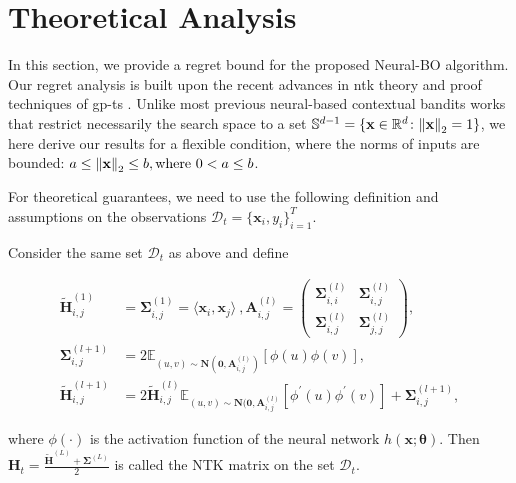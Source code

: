 \section{Theoretical Analysis}
\label{section:neural-bo_regret_analysis}

In this section, we provide a regret bound for the proposed Neural-BO algorithm. Our regret analysis is built upon the recent advances in \ac{ntk} theory \citep{allen2019convergence, cao2019generalization} and proof techniques of \ac{gp}-\ac{ts} \citep{chowdhury2017kernelized}. 
Unlike most previous neural-based contextual bandits works \citep{zhang2021neural, zhou2020neural} that restrict necessarily the search space to a set $\mathbb{S}^{d-1} = \{ \mathbf{x} \in \mathbb {R}^d \colon \norm{\mathbf{x}}_2 = 1 \}$, we here derive our results for a flexible condition, where the norms of inputs are bounded: $a \leq \norm{\mathbf{x}}_2 \leq b, \text{where } 0 < a \le b$. 

For theoretical guarantees, we need to use the following definition and assumptions on the observations $\mathcal{D}_t = \{\mathbf{x}_i, y_i\}^T_{i=1}$.


\begin{definition} 
\label{def:neural-bo_NTK_matrix}
Consider the same set $\mathcal{D}_t$ as above and define

\begin{align*}
    \widetilde{\mathbf{H}}_{i,j}^{(1)} & = \mathbf{\Sigma}_{i,j}^{(1)} = \langle  \mathbf{x}_i, \mathbf{x}_j \rangle\ , \mathbf{A}_{i,j}^{(l)} = 
    \begin{pmatrix}
    \mathbf{\Sigma}_{i,i}^{(l)} & \mathbf{\Sigma}_{i,j}^{(l)} 
    \\
    \mathbf{\Sigma}_{i,j}^{(l)} & \mathbf{\Sigma}_{j,j}^{(l)}
    \end{pmatrix}, 
\\
    \mathbf{\Sigma}_{i,j}^{(l+1)} &= 2 \mathbb{E}_{(u,v) \sim \mathbf{N}(\mathbf{0}, \mathbf{A}_{i,j}^{(l)})} [\phi(u) \phi(v)],
\\
    \widetilde{\mathbf{H}}_{i,j}^{(l+1)} &= 2\widetilde{\mathbf{H}}_{i,j}^{(l)}\mathbb{E}_{(u,v) \sim \mathbf{N}(\mathbf{0}, \mathbf{A}_{i,j}^{(l)}} [\phi^\prime(u) \phi^\prime(v)] + \mathbf{\Sigma}_{i,j}^{(l+1)},
\end{align*}

\noindent where $\phi(\cdot)$ is the activation function of the neural network $h(\mathbf{x}; \boldsymbol{\theta})$.
Then $\mathbf{H}_t = \frac{\mathbf{\widetilde{H}}^{(L)}+ \mathbf{\Sigma} ^ {(L)}}{2}$ is called the NTK matrix on the set $\mathcal{D}_t$. 
\end{definition}



